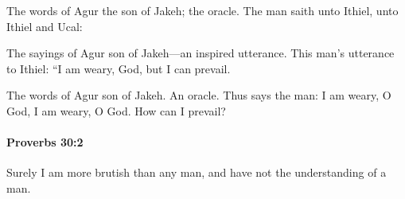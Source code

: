 			\begin{versebox}
					\item[BHS] 
					\item[ASV] The words of Agur the son of Jakeh; the oracle. The man saith unto Ithiel, unto Ithiel and Ucal:
					\item[NIV] The sayings of Agur son of Jakeh—an inspired utterance. This man’s utterance to Ithiel: “I am weary, God, but I can prevail.
					\item[NRSV] The words of Agur son of Jakeh. An oracle. Thus says the man: I am weary, O God, I am weary, O God. How can I prevail?
			\end{versebox}

		\paragraph{Proverbs 30:2} %
			\label{PROVERBS-30-2}

			Surely I am more brutish than any man, and have not the understanding of a man.

